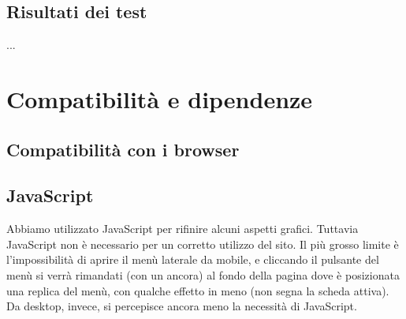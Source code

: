 \documentclass[12pt]{article}
\begin{document}
	\subsection{Risultati dei test}
	...
	
	\section{Compatibilità e dipendenze}
	\subsection{Compatibilità con i browser}
	
	\subsection{JavaScript}
	Abbiamo utilizzato JavaScript per rifinire alcuni aspetti grafici. Tuttavia JavaScript non è necessario per un corretto utilizzo del sito. Il più grosso limite è l'impossibilità di aprire il menù laterale da mobile, e cliccando il pulsante del menù si verrà rimandati (con un ancora) al fondo della pagina dove è posizionata una replica del menù, con qualche effetto in meno (non segna la scheda attiva). Da desktop, invece, si percepisce ancora meno la necessità di JavaScript.
	
\end{document}

